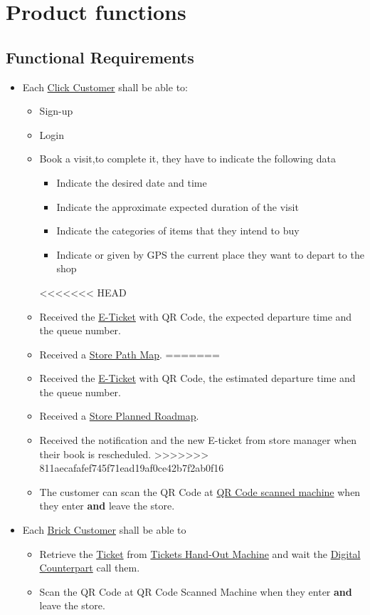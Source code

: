 \documentclass[a4paper,12pt]{book}
\begin{document}
\section{Product functions}
\subsection{Functional Requirements}
\begin{itemize}
	\item Each \hyperref[Definitions]{Click Customer} shall be able to: 
	\begin{itemize}
		\item Sign-up 
		\item Login
		\item Book a visit,to complete it, they have to indicate the following data
		\begin{itemize}
			\item Indicate the desired date and time
			\item Indicate the approximate expected duration of the visit
			\item Indicate the categories of items that they intend to buy
			\item Indicate or given by GPS the current place they want to depart to the shop
		\end{itemize}
<<<<<<< HEAD
		\item Received the \hyperref[Definitions]{E-Ticket} with QR Code, the expected departure time and the queue number.
		\item Received a \hyperref[Definitions]{Store Path Map}.	
=======
		\item Received the \hyperref[Definitions]{E-Ticket} with QR Code, the estimated departure time and the queue number.
		\item Received a \hyperref[Definitions]{Store Planned Roadmap}.	
		\item Received the notification and the new E-ticket from store manager when their book is rescheduled.
>>>>>>> 811aecafafef745f71ead19af0ce42b7f2ab0f16
		\item The customer can scan the QR Code at \hyperref[Definitions]{QR Code scanned machine} when they enter \textbf{and} leave the store.
	\end{itemize}

	\item Each \hyperref[Definitions]{Brick Customer} shall be able to
	\begin{itemize}
		\item Retrieve the \hyperref[Definitions]{Ticket} from \hyperref[Definitions]{Tickets Hand-Out Machine} and wait the \hyperref[Definitions]{Digital Counterpart} call them.
		\item Scan the QR Code at QR Code Scanned Machine when they enter \textbf{and} leave the store.
	\end{itemize}


\end{itemize}
\end{document}
